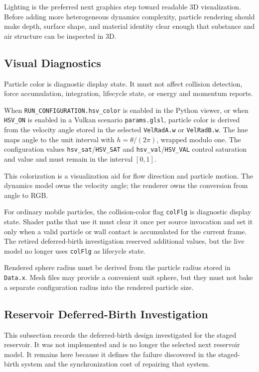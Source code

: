 Lighting is the preferred next graphics step toward readable 3D visualization.
Before adding more heterogeneous dynamics complexity, particle rendering should
make depth, surface shape, and material identity clear enough that substance
and air structure can be inspected in 3D.

\subsection{Visual Diagnostics}

Particle color is diagnostic display state.  It must not affect collision
detection, force accumulation, integration, lifecycle state, or energy and
momentum reports.

When \texttt{RUN\_CONFIGURATION.hsv\_color} is enabled in the Python viewer,
or when \texttt{HSV\_ON} is enabled in a Vulkan scenario
\texttt{params.glsl}, particle color is derived from the velocity angle stored
in the selected \texttt{VelRadA.w} or \texttt{VelRadB.w}.  The hue maps angle to the unit interval with
\(h=\theta/(2\pi)\), wrapped modulo one.  The configuration values
\texttt{hsv\_sat}/\texttt{HSV\_SAT} and \texttt{hsv\_val}/\texttt{HSV\_VAL}
control saturation and value and must remain in the interval \([0,1]\).

This colorization is a visualization aid for flow direction and particle
motion.  The dynamics model owns the velocity angle; the renderer owns the
conversion from angle to RGB.

For ordinary mobile particles, the collision-color flag \texttt{colFlg} is
diagnostic display state.  Shader paths that use it must clear it once per
source invocation and set it only when a valid particle or wall contact is
accumulated for the current frame.  The retired deferred-birth investigation
reserved additional values, but the live model no longer uses
\texttt{colFlg} as lifecycle state.

Rendered sphere radius must be derived from the particle radius stored in
\texttt{Data.x}.  Mesh files may provide a convenient unit sphere, but they
must not bake a separate configuration radius into the rendered particle size.

\subsection{Reservoir Deferred-Birth Investigation}

This subsection records the deferred-birth design investigated for the staged
reservoir.  It was not implemented and is no longer the selected next
reservoir model.  It remains here because it defines the failure discovered in
the staged-birth system and the synchronization cost of repairing that system.


